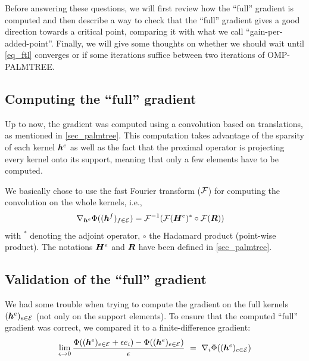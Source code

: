 \noindent
Before answering these questions, we will first review how the “full” gradient is computed and then describe a way to check that the “full” gradient gives a good direction towards a critical point, comparing it with what we call “gain-per-added-point”. Finally, we will give some thoughts on whether we should wait until \eqref{eq_ftl} converges or if some iterations suffice between two iterations of OMP-PALMTREE.


\subsection{Computing the “full” gradient}\label{sec_full_grad}
Up to now, the gradient was computed using a convolution based on translations, as mentioned in \cref{sec_palmtree}. This computation takes advantage of the sparsity of each kernel $\bm{h}^e$ as well as the fact that the proximal operator is projecting every kernel onto its support, meaning that only a few elements have to be computed.

\noindent
We basically chose to use the fast Fourier transform (${\mathcal F}$) for computing the convolution on the whole kernels, i.e.,
\begin{align*}
	\nabla_{\bm{h}^e} \Phi((\bm{h}^f)_{f \in \mathcal E})&= {\mathcal F}^{-1}({\mathcal F}(\bm{H}^{e})^* \circ {\mathcal F}(\bm{R}))
\end{align*}
with ${}^*$ denoting the adjoint operator, $\circ$ the Hadamard product (point-wise product). The notations $\bm{H}^e$ and $\bm{R}$ have been defined in \cref{sec_palmtree}.

\subsection{Validation of the “full” gradient}
We had some trouble when trying to compute the gradient on the full kernels $(\bm{h}^e)_{e \in \mathcal E}$ (not only on the support elements). To ensure that the computed “full” gradient was correct, we compared it to a finite-difference gradient:
\begin{equation*}\lim_{\epsilon \rightarrow 0} \frac{\Phi((\bm{h}^e)_{e \in \mathcal E}+\epsilon e_i) - \Phi ((\bm{h}^e)_{e \in \mathcal E}) }{\epsilon} ~=~ \nabla_i \Phi ((\bm{h}^e)_{e \in \mathcal E})\end{equation*}

